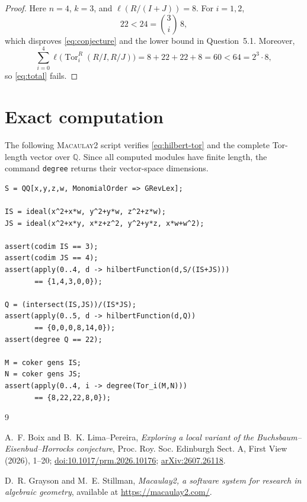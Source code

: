 \documentclass[11pt]{amsart}
\begin{document}
\begin{proof}
Here $n=4$, $k=3$, and $\ell(R/(I+J))=8$. For $i=1,2$,
\[
22<24=\binom{3}{i}\,8,
\]
which disproves \eqref{eq:conjecture} and the lower bound in
Question~5.1. Moreover,
\[
\sum_{i=0}^{4}\ell\bigl(\operatorname{Tor}_i^R(R/I,R/J)\bigr)
=8+22+22+8=60<64=2^3\cdot8,
\]
so \eqref{eq:total} fails.
\end{proof}

\section{Exact computation}

The following \textsc{Macaulay2} script \cite{M2} verifies
\eqref{eq:hilbert-tor} and the complete Tor-length vector over
$\mathbb Q$. Since all computed modules have finite length, the command
\texttt{degree} returns their vector-space dimensions.

{\footnotesize
\begin{verbatim}
S = QQ[x,y,z,w, MonomialOrder => GRevLex];

IS = ideal(x^2+x*w, y^2+y*w, z^2+z*w);
JS = ideal(x^2+x*y, x*z+z^2, y^2+y*z, x*w+w^2);

assert(codim IS == 3);
assert(codim JS == 4);
assert(apply(0..4, d -> hilbertFunction(d,S/(IS+JS)))
       == {1,4,3,0,0});

Q = (intersect(IS,JS))/(IS*JS);
assert(apply(0..5, d -> hilbertFunction(d,Q))
       == {0,0,0,8,14,0});
assert(degree Q == 22);

M = coker gens IS;
N = coker gens JS;
assert(apply(0..4, i -> degree(Tor_i(M,N)))
       == {8,22,22,8,0});
\end{verbatim}
}

\enlargethispage{4\baselineskip}

\begin{thebibliography}{9}

A.~F. Boix and B.~K. Lima--Pereira,
\emph{Exploring a local variant of the
Buchsbaum--Eisenbud--Horrocks conjecture},
Proc. Roy. Soc. Edinburgh Sect. A, First View (2026), 1--20;
\href{https://doi.org/10.1017/prm.2026.10176}
{doi:10.1017/prm.2026.10176};
\href{https://arxiv.org/abs/2607.26118}{arXiv:2607.26118}.

D.~R. Grayson and M.~E. Stillman,
\emph{Macaulay2, a software system for research in algebraic geometry},
available at \url{https://macaulay2.com/}.

\end{thebibliography}
\end{document}
